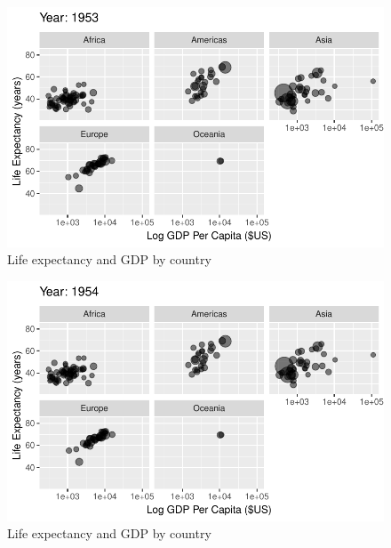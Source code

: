 \documentclass[
  letterpaper,
  DIV=11,
  numbers=noendperiod]{scrreport}
\theoremstyle{definition}
\theoremstyle{remark}
\begin{document}
\begin{figure}

{\centering \includegraphics{index_files/figure-pdf/fig-anim-lifegdp-3.pdf}

}

\caption{\label{fig-anim-lifegdp-3}Life expectancy and GDP by country}

\end{figure}

\begin{figure}

{\centering \includegraphics{index_files/figure-pdf/fig-anim-lifegdp-4.pdf}

}

\caption{\label{fig-anim-lifegdp-4}Life expectancy and GDP by country}

\end{figure}
\end{document}
